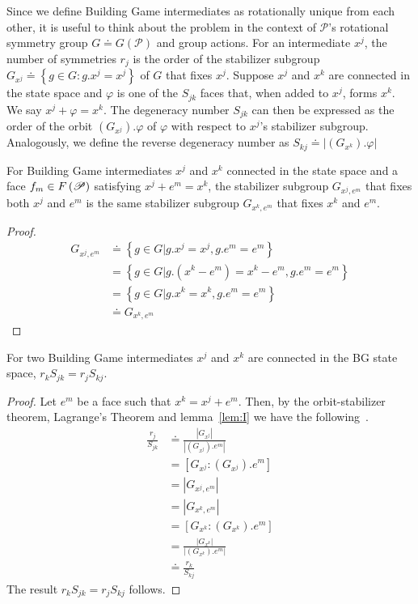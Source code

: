 Since we define Building Game intermediates as rotationally unique from each other, it is useful to think about the problem in the context of $\mathscr{P}$'s rotational symmetry group $G \doteq G\left(\mathscr{P}\right)$ and group actions. For an intermediate $x^j$, the number of symmetries $r_j$ is the order of the stabilizer subgroup $G_{x^j} \doteq \left\{g \in G : g.x^j = x^j\right\}$ of $G$ that fixes $x^j$. Suppose $x^j$ and $x^k$ are connected in the state space and $\varphi$ is one of the $S_{jk}$ faces that, when added to $x^j$, forms $x^k$. We say $x^j + \varphi = x^k$. The degeneracy number $S_{jk}$ can then be expressed as the order of the orbit $\left(G_{x^j}\right).\varphi$ of $\varphi$ with respect to $x^j$'s stabilizer subgroup. Analogously, we define the reverse degeneracy number as $S_{kj} \doteq \left|\left(G_{x^k}\right).\varphi\right|$

\begin{mylem}
\label{lem:I}
For Building Game intermediates $x^j$ and $x^k$ connected in the state space and a face $f_m \in F\left(\mathscr{P}\right)$ satisfying $x^j + e^m = x^k$, the stabilizer subgroup $G_{x^j,e^m}$ that fixes both $x^j$ and $e^m$ is the same stabilizer subgroup $G_{x^k,e^m}$ that fixes $x^k$ and $e^m$.
\end{mylem}
\begin{proof}
\begin{align}
G_{x^j,e^m} &\doteq \left\{g \in G | g.x^j = x^j, g.e^m = e^m \right\} \\
                &= \left\{g \in G | g.\left(x^k - e^m\right) = x^k - e^m, g.e^m = e^m \right\} \\
                &= \left\{g \in G | g.x^k = x^k, g.e^m = e^m \right\} \\
                &\doteq G_{x^k,e^m}
\end{align}
\end{proof}


\begin{mythm}
\label{thm:J}
For two Building Game intermediates $x^j$ and $x^k$ are connected in the BG state space, $r_kS_{jk} = r_jS_{kj}$.
\end{mythm}
\begin{proof}
Let $e^m$ be a face such that $x^k = x^j + e^m$. Then, by the orbit-stabilizer theorem, Lagrange's Theorem and lemma~\ref{lem:I} we have the following~\cite{Rotman1995}.
\begin{align}
\frac{r_j}{S_{jk}} &\doteq \frac{\left|G_{x^j}\right|}{\left|\left(G_{x^j}\right).e^m\right|} \\
                   &= \left[G_{x^j} : \left(G_{x^j}\right).e^m \right] \\
                   &= \left|G_{x^j,e^m}\right| \\
                   &= \left|G_{x^k,e^m}\right| \\
                   &= \left[G_{x^k} : \left(G_{x^k}\right).e^m \right] \\
                   &= \frac{\left|G_{x^k}\right|}{\left|\left(G_{x^k}\right).e^m\right|} \\
                   &\doteq \frac{r_k}{S_{kj}} 
\end{align}
The result $r_kS_{jk} = r_jS_{kj}$ follows.
\end{proof}


